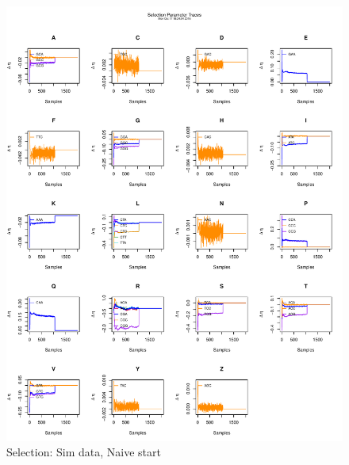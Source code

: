 \documentclass[11pt]{labbook}
\begin{document}
    \begin{figure}
        \centering
        \includegraphics[scale=.65]{FONSE_Plots/2016/October_17/simulated_naive_sel}
        \caption{Selection: Sim data, Naive start}
        \label{fig:OCT17_S.N.SEL}
    \end{figure}
    
\end{document}
